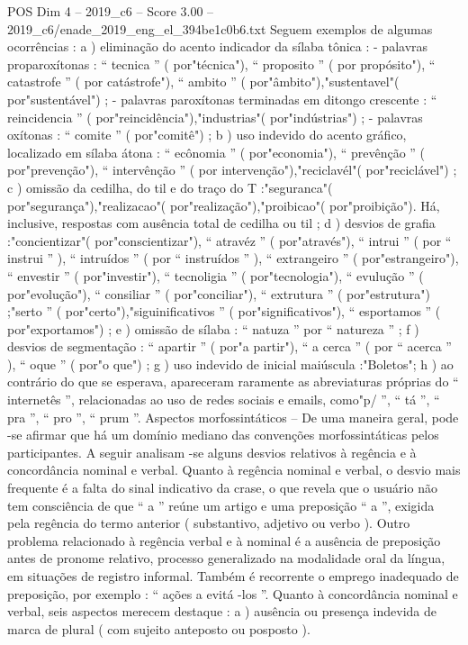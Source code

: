 \begin{textsample}{POS Dim 4 – 2019\_c6 – Score 3.00 – 2019\_c6/enade\_2019\_eng\_el\_394be1c0b6.txt}
Seguem exemplos de algumas ocorrências : a ) eliminação do acento indicador da sílaba tônica : - palavras proparoxítonas : “ tecnica ” ( por"técnica"), “ proposito ” ( por propósito"), “ catastrofe ” ( por catástrofe"), “ ambito ” ( por"âmbito"),"sustentavel"( por"sustentável") ; - palavras paroxítonas terminadas em ditongo crescente : “ reincidencia ” ( por"reincidência"),"industrias"( por"indústrias") ; - palavras oxítonas : “ comite ” ( por"comitê") ; b ) uso indevido do acento gráfico, localizado em sílaba átona : “ ecônomia ” ( por"economia"), “ prevênção ” ( por"prevenção"), “ intervênção ” ( por intervenção"),"reciclavél"( por"reciclável") ; c ) omissão da cedilha, do til e do traço do T :"seguranca"( por"segurança"),"realizacao"( por"realização"),"proibicao"( por"proibição").
Há, inclusive, respostas com ausência total de cedilha ou til ; d ) desvios de grafia :"concientizar"( por"conscientizar"), “ atravéz ” ( por"através"), “ intrui ” ( por “ instrui ” ), “ intruídos ” ( por “ instruídos ” ), “ extrangeiro ” ( por"estrangeiro"), “ envestir ” ( por"investir"), “ tecnoligia ” ( por"tecnologia"), “ evulução ” ( por"evolução"), “ consiliar ” ( por"conciliar"), “ extrutura ” ( por"estrutura") ;"serto ” ( por"certo"),"siguinificativos ” ( por"significativos"), “ esportamos ” ( por"exportamos") ; e ) omissão de sílaba : “ natuza ” por “ natureza ” ; f ) desvios de segmentação : “ apartir ” ( por"a partir"), “ a cerca ” ( por “ acerca ” ), “ oque ” ( por"o que") ; g ) uso indevido de inicial maiúscula :"Boletos"; h ) ao contrário do que se esperava, apareceram raramente as abreviaturas próprias do “ internetês ”, relacionadas ao uso de redes sociais e emails, como"p/ ”, “ tá ”, “ pra ”, “ pro ”, “ prum ”.
Aspectos morfossintáticos – De uma maneira geral, pode -se afirmar que há um domínio mediano das convenções morfossintáticas pelos participantes.
A seguir analisam -se alguns desvios relativos à regência e à concordância nominal e verbal.
Quanto à regência nominal e verbal, o desvio mais frequente é a falta do sinal indicativo da crase, o que revela que o usuário não tem consciência de que “ a ” reúne um artigo e uma preposição “ a ”, exigida pela regência do termo anterior ( substantivo, adjetivo ou verbo ).
Outro problema relacionado à regência verbal e à nominal é a ausência de preposição antes de pronome relativo, processo generalizado na modalidade oral da língua, em situações de registro informal.
Também é recorrente o emprego inadequado de preposição, por exemplo : “ ações a evitá -los ”.
Quanto à concordância nominal e verbal, seis aspectos merecem destaque : a ) ausência ou presença indevida de marca de plural ( com sujeito anteposto ou posposto ).

\end{textsample}
